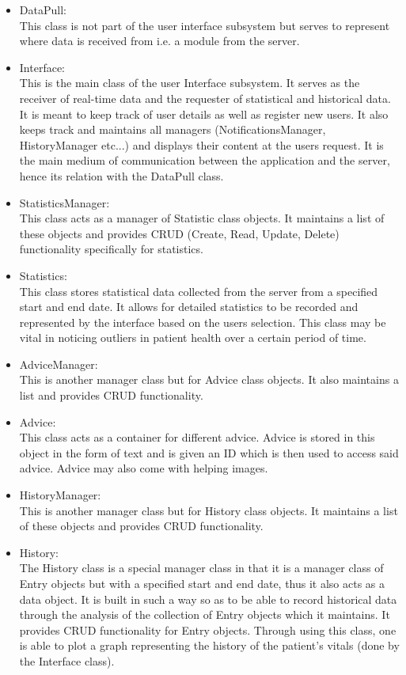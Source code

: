 \begin{itemize}
	\item DataPull:\\
	This class is not part of the user interface subsystem but serves to represent where data is received from i.e. a module from the server. 
	\item Interface:\\
	This is the main class of the user Interface subsystem. It serves as the receiver of real-time data and the requester of statistical and historical data. It is meant to keep track of user details as well as register new users. It also keeps track and maintains all managers (NotificationsManager, HistoryManager etc...) and displays their content at the users request. It is the main medium of communication between the application and the server, hence its relation with the DataPull class. 
	\item StatisticsManager:\\
	This class acts as a  manager of Statistic class objects. It maintains a list of these objects and provides CRUD (Create, Read, Update, Delete) functionality specifically for statistics. 
	\item Statistics:\\
	This class stores statistical data collected from the server from a specified start and end date. It allows for detailed statistics to be recorded and represented by the interface based on the users selection. This class may be vital in noticing outliers in patient health over a certain period of time. 
	\item AdviceManager:\\
	This is another manager class but for Advice class objects. It also maintains a list and provides CRUD functionality. 
	\item Advice:\\
	This class acts as a container for different advice. Advice is stored in this object in the form of text and is given an ID which is then used to access said advice. Advice may also come with helping images.
  	\item HistoryManager:\\
	This is another manager class but for History class objects. It maintains a list of these objects and provides CRUD functionality. 
  	\item History:\\
	The History class is a special manager class in that it is a manager class of Entry objects but with a specified start and end date, thus it also acts as a data object. It is built in such a way so as to be able to record historical data through the analysis of the collection of Entry objects which it maintains. It provides CRUD functionality for Entry objects. Through using this class, one is able to plot a graph representing the history of the patient's vitals (done by the Interface class). 

\end{itemize}
